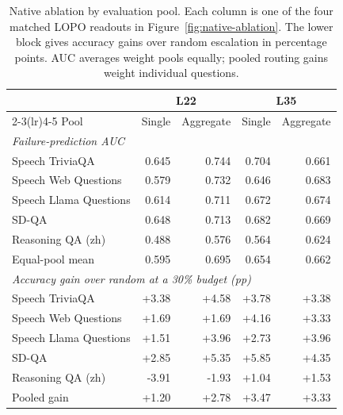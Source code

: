\begin{table}[ht]
\centering\small
\caption{Native ablation by evaluation pool. Each column is one of
the four matched LOPO readouts in Figure~\ref{fig:native-ablation}.
The lower block gives accuracy gains over random escalation in
percentage points. AUC averages weight pools equally; pooled routing
gains weight individual questions.}
\label{tab:native-ablation-values}
\begin{tabular}{lrrrr}
\toprule
& \multicolumn{2}{c}{L22} & \multicolumn{2}{c}{L35} \\
\cmidrule(lr){2-3}\cmidrule(lr){4-5}
Pool & Single & Aggregate & Single & Aggregate \\
\midrule
\multicolumn{5}{l}{\textit{Failure-prediction AUC}} \\
Speech TriviaQA & 0.645 & 0.744 & 0.704 & 0.661 \\
Speech Web Questions & 0.579 & 0.732 & 0.646 & 0.683 \\
Speech Llama Questions & 0.614 & 0.711 & 0.672 & 0.674 \\
SD-QA & 0.648 & 0.713 & 0.682 & 0.669 \\
Reasoning QA (zh) & 0.488 & 0.576 & 0.564 & 0.624 \\
\midrule
Equal-pool mean & 0.595 & 0.695 & 0.654 & 0.662 \\
\midrule
\multicolumn{5}{l}{\textit{Accuracy gain over random at a 30\% budget (pp)}} \\
Speech TriviaQA & +3.38 & +4.58 & +3.78 & +3.38 \\
Speech Web Questions & +1.69 & +1.69 & +4.16 & +3.33 \\
Speech Llama Questions & +1.51 & +3.96 & +2.73 & +3.96 \\
SD-QA & +2.85 & +5.35 & +5.85 & +4.35 \\
Reasoning QA (zh) & -3.91 & -1.93 & +1.04 & +1.53 \\
\midrule
Pooled gain & +1.20 & +2.78 & +3.47 & +3.33 \\
\bottomrule
\end{tabular}
\end{table}
